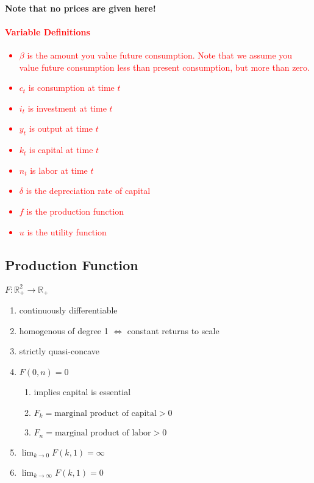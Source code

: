 \documentclass{article}
\begin{document}
\paragraph{Note that no prices are given here!}
{
\textcolor{red}{\paragraph{Variable Definitions}{
\begin {itemize}
    \item $\beta$ is the amount you value future consumption. Note 
that we assume you value future consumption less than present 
consumption, but more than zero.
    \item $c_t$ is consumption at time $t$
    \item $i_t$ is investment at time $t$
    \item $y_t$ is output at time $t$
    \item $k_t$ is capital at time $t$
    \item $n_t$ is labor at time $t$
    \item $\delta$ is the depreciation rate of capital
    \item $f$ is the production function
    \item $u$ is the utility function
\end{itemize}
}
}
}
\subsection{Production Function}
$F : \mathbb{R}^2_+ \rightarrow \mathbb{R}_+$
\begin{enumerate}
    \item continuously differentiable
    \item homogenous of degree 1 $\Leftrightarrow$ constant returns to scale
    \item strictly quasi-concave
    \item $F(0,n) = 0$
    \begin {enumerate}
        \item implies capital is essential
        \item $F_k = \text{marginal product of capital} > 0$
        \item $F_n = \text{marginal product of labor} > 0$
    \end{enumerate}
    \item $\lim_{k \to 0} F(k,1) = \infty$
    \item $\lim_{k \to \infty} F(k,1) = 0$
\end{enumerate}
\end{document}
